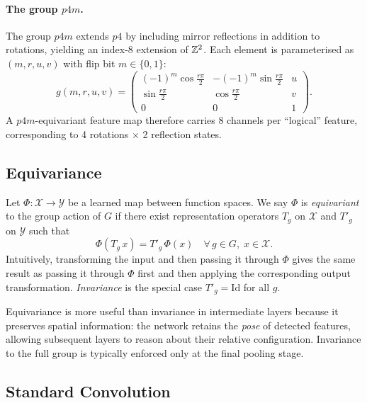 \paragraph{The group \(p4m\).}
The group \(p4m\) extends \(p4\) by including mirror reflections in addition to rotations,
yielding an index-8 extension of \(\mathbb{Z}^2\). Each element is parameterised as
\((m, r, u, v)\) with flip bit \(m \in \{0, 1\}\):
\begin{equation}
  g(m, r, u, v) =
  \begin{pmatrix}
    (-1)^m \cos\!\tfrac{r\pi}{2} & -(-1)^m \sin\!\tfrac{r\pi}{2} & u \\
    \sin\!\tfrac{r\pi}{2}        &  \cos\!\tfrac{r\pi}{2}         & v \\
    0                            &  0                             & 1
  \end{pmatrix}.
  \label{eq:p4m-matrix}
\end{equation}
A \(p4m\)-equivariant feature map therefore carries 8 channels per ``logical'' feature,
corresponding to 4 rotations \(\times\) 2 reflection states.

\subsection{Equivariance}

Let \(\Phi: \mathcal{X} \to \mathcal{Y}\) be a learned map between function spaces. We say
\(\Phi\) is \emph{equivariant} to the group action of \(G\) if there exist representation
operators \(T_g\) on \(\mathcal{X}\) and \(T'_g\) on \(\mathcal{Y}\) such that
\begin{equation}
  \Phi(T_g\, x) = T'_g\, \Phi(x) \quad \forall\, g \in G,\; x \in \mathcal{X}.
  \label{eq:equivariance}
\end{equation}
Intuitively, transforming the input and then passing it through \(\Phi\) gives the same result
as passing it through \(\Phi\) first and then applying the corresponding output transformation.
\emph{Invariance} is the special case \(T'_g = \mathrm{Id}\) for all \(g\).

Equivariance is more useful than invariance in intermediate layers because it preserves
spatial information: the network retains the \emph{pose} of detected features, allowing
subsequent layers to reason about their relative configuration. Invariance to the full group
is typically enforced only at the final pooling stage.

\subsection{Standard Convolution}


